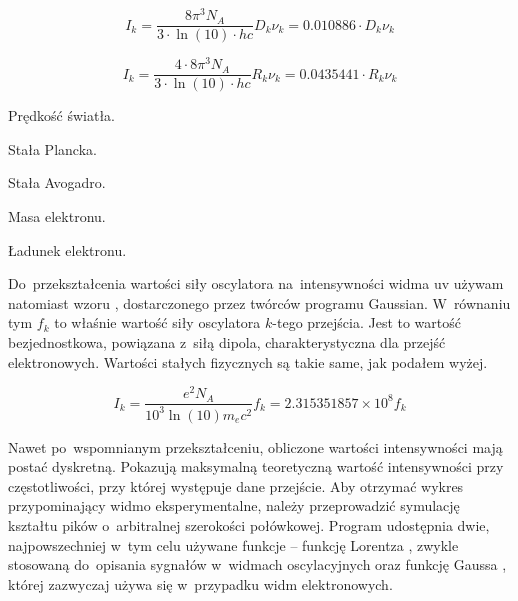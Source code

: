\begin{equation}\label{eq:dipole-strength}
  I_k = \frac{8 \pi^3 N_{\!A}}{3 \cdot \ln(10) \cdot hc} D_k \nu_k
      = 0.010886 \cdot D_k \nu_k
\end{equation}

\begin{equation}\label{eq:rotator-strength}
  I_k = \frac{4 \cdot 8 \pi^3 N_{\!A}}{3 \cdot \ln(10) \cdot hc} R_k \nu_k
      = 0.0435441 \cdot R_k \nu_k
\end{equation}

\begin{description}[noitemsep]
  \item[$c = \SI{2.99792458e10}{\centi\meter\per\second}$] \hfill Prędkość światła.
  \item[$h = \SI{6.62606896e-30}{\kilo\gram\centi\meter\squared\per\second}$] \hfill Stała Plancka.
  \item[$N_A = \SI{6.02214199e23}{\per\mole}$] \hfill Stała Avogadro.
  \item[$m_e = \SI{9.10938e-28}{\gram}$] \hfill Masa elektronu.
  \item[$e = \SI{4.803204e-10}{\esu}$] \hfill Ładunek elektronu.
\end{description}

Do~przekształcenia wartości siły oscylatora na~intensywności widma \gls{uv} używam natomiast
  wzoru , dostarczonego przez twórców programu
  Gaussian.
W~równaniu tym $f_k$ to właśnie wartość siły oscylatora $k$-tego przejścia.
Jest to wartość bezjednostkowa, powiązana z~siłą dipola,
  charakterystyczna dla przejść elektronowych.
Wartości stałych fizycznych są takie same, jak podałem wyżej.

\begin{equation}\label{eq:oscillator-strength}
  I_k = \frac{e^2 N_A}{10^3 \ln(10) m_e c^2} f_k
      = 2.315351857 \times 10^8 f_k
\end{equation}

Nawet po~wspomnianym przekształceniu, obliczone wartości intensywności mają postać dyskretną.
Pokazują maksymalną teoretyczną wartość intensywności przy częstotliwości, przy której
  występuje dane przejście.
Aby otrzymać wykres przypominający widmo eksperymentalne, należy przeprowadzić symulację
  kształtu pików o~arbitralnej szerokości połówkowej.
Program \tesliper{} udostępnia dwie, najpowszechniej w~tym celu używane funkcje \--- funkcję
  Lorentza , zwykle stosowaną do~opisania sygnałów w~widmach
  oscylacyjnych oraz funkcję Gaussa , której zazwyczaj używa się
  w~przypadku widm elektronowych.

